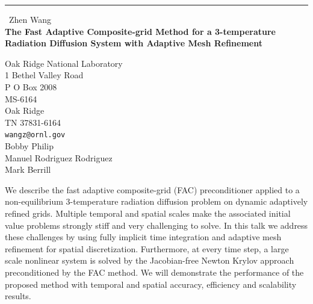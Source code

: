 \documentclass{report}
\begin{document}
\begin{center}
\rule{6in}{1pt} \
{\large Zhen Wang \\
{\bf The Fast Adaptive Composite-grid Method for a 3-temperature Radiation Diffusion System with Adaptive Mesh Refinement}}

Oak Ridge National Laboratory \\ 1 Bethel Valley Road \\ P O Box 2008 \\ MS-6164 \\ Oak Ridge \\ TN 37831-6164
\\
{\tt wangz@ornl.gov}\\
Bobby Philip\\
Manuel Rodriguez Rodriguez\\
Mark Berrill\end{center}

We describe the fast adaptive composite-grid (FAC) preconditioner
applied to a non-equilibrium 3-temperature radiation diffusion problem on
dynamic adaptively refined grids. Multiple temporal and spatial scales
make the associated initial value problems strongly stiff and very
challenging to solve. In this talk we address these challenges by using
fully implicit time integration and adaptive mesh refinement for spatial
discretization. Furthermore, at every time step, a large scale nonlinear
system is solved by the Jacobian-free Newton Krylov approach
preconditioned by the FAC method. We will demonstrate the performance of
the proposed method with temporal and spatial accuracy, efficiency and
scalability results.
\end{document}
